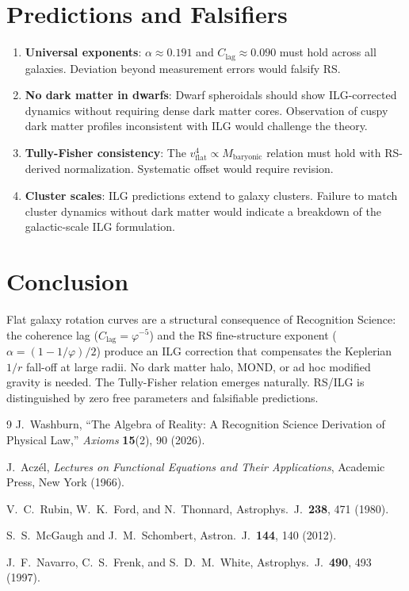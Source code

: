 \documentclass[12pt,a4paper]{article}
\theoremstyle{definition}
\theoremstyle{remark}
\begin{document}
\section{Predictions and Falsifiers}
\label{sec:falsifiers}

\begin{enumerate}[label=(\roman*)]
  \item \textbf{Universal exponents}: $\alpha \approx 0.191$ and
  $C_{\mathrm{lag}} \approx 0.090$ must hold across all galaxies.
  Deviation beyond measurement errors would falsify RS.
  \item \textbf{No dark matter in dwarfs}: Dwarf spheroidals should
  show ILG-corrected dynamics without requiring dense dark matter
  cores.  Observation of cuspy dark matter profiles inconsistent with
  ILG would challenge the theory.
  \item \textbf{Tully-Fisher consistency}: The $v_{\mathrm{flat}}^4
  \propto M_{\mathrm{baryonic}}$ relation must hold with RS-derived
  normalization.  Systematic offset would require revision.
  \item \textbf{Cluster scales}: ILG predictions extend to galaxy
  clusters.  Failure to match cluster dynamics without dark matter
  would indicate a breakdown of the galactic-scale ILG formulation.
\end{enumerate}

\section{Conclusion}
\label{sec:conclusion}

Flat galaxy rotation curves are a structural consequence of
Recognition Science: the coherence lag ($C_{\mathrm{lag}} =
\varphi^{-5}$) and the RS fine-structure exponent
($\alpha = (1 - 1/\varphi)/2$) produce an ILG correction that
compensates the Keplerian $1/r$ fall-off at large radii.  No dark
matter halo, MOND, or ad hoc modified gravity is needed.  The
Tully-Fisher relation emerges naturally.  RS/ILG is distinguished by
zero free parameters and falsifiable predictions.

\begin{thebibliography}{9}
J.~Washburn, ``The Algebra of Reality: A Recognition Science Derivation
of Physical Law,'' \emph{Axioms} \textbf{15}(2), 90 (2026).

J.~Acz\'el, \textit{Lectures on Functional Equations and Their Applications},
Academic Press, New York (1966).

V.~C.~Rubin, W.~K.~Ford, and N.~Thonnard, Astrophys.\ J.\
\textbf{238}, 471 (1980).

S.~S.~McGaugh and J.~M.~Schombert, Astron.\ J.\ \textbf{144}, 140
(2012).

J.~F.~Navarro, C.~S.~Frenk, and S.~D.~M.~White, Astrophys.\ J.\
\textbf{490}, 493 (1997).
\end{thebibliography}
\end{document}
